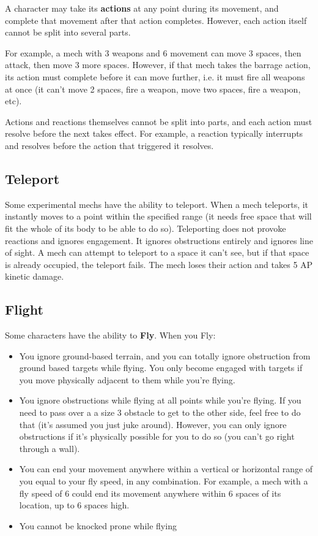 A character may take its \textbf{actions} at any point during its movement, and complete that movement after that action completes. However, each action itself cannot be split into several parts.

For example, a mech with 3 weapons and 6 movement can move 3 spaces, then attack, then move 3 more spaces. However, if that mech takes the barrage action, its action must complete before it can move further, i.e. it must fire all weapons at once (it can't move 2 spaces, fire a weapon, move two spaces, fire a weapon, etc).

Actions and reactions themselves cannot be split into parts, and each action must resolve before the next takes effect. For example, a reaction typically interrupts and resolves before the action that triggered it resolves.


\subsection{Teleport}

Some experimental mechs have the ability to teleport. When a mech teleports, it instantly moves to a point within the specified range (it needs free space that will fit the whole of its body to be able to do so). Teleporting does not provoke reactions and ignores engagement. It ignores obstructions entirely and ignores line of sight. A mech can attempt to teleport to a space it can't see, but if that space is already occupied, the teleport fails. The mech loses their action and takes 5 AP kinetic damage.

\subsection{Flight}

Some characters have the ability to \textbf{Fly}. When you Fly:

\begin{itemize}
\item You ignore ground-based terrain, and you can totally ignore obstruction from ground based targets while flying. You only become engaged with targets if you move physically adjacent to them while you're flying.
\item You ignore obstructions while flying at all points while you're flying. If you need to pass over a a size 3 obstacle to get to the other side, feel free to do that (it's assumed you just juke around). However, you can only ignore obstructions if it's physically possible for you to do so (you can't go right through a wall).
\item You can end your movement anywhere within a vertical or horizontal range of you equal to your fly speed, in any combination. For example, a mech with a fly speed of 6 could end its movement anywhere within 6 spaces of its location, up to 6 spaces high.
\item You cannot be knocked prone while flying
\end{itemize}


